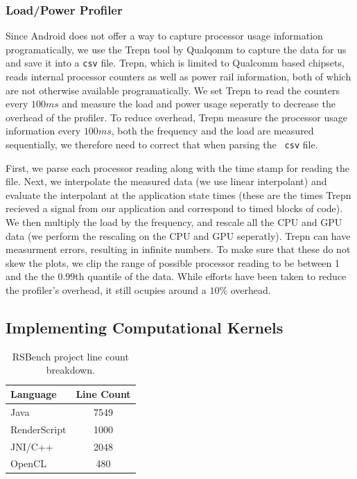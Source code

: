 \subsubsection{Load/Power Profiler}

Since Android does not offer a way to capture processor usage information
programatically, we use the Trepn tool by Qualqomm to capture the data for us
and save it into a {\tt csv} file.   Trepn, which is limited to Qualcomm based
chipsets, reads internal processor counters as well as power rail information,
both of which are not otherwise available programatically.  We set Trepn to read
the counters every $100ms$ and measure the load and power usage seperatly to
decrease the overhead of the profiler.  To reduce overhead, Trepn measure the
processor usage information every $100ms$, both the frequency and the load are
measured sequentially, we therefore need to correct that when parsing the {\tt
csv} file.

First, we parse each processor reading along with the time stamp for reading the
file.  Next, we interpolate the measured data (we use linear interpolant) and
evaluate the interpolant at the application state times (these are the times
Trepn recieved a signal from our application and correspond to timed blocks of
code).  We then multiply the load by the frequency, and rescale all the CPU and
GPU data (we perform the rescaling on the CPU and GPU seperatly).  Trepn can
have measurment errors, resulting in infinite numbers.  To make sure that these
do not skew the plots, we clip the range of possible processor reading to be
between 1 and the the $0.99$th quantile of the data.  While efforts have
been taken to reduce the profiler's overhead, it still ocupies around a
$10\%$ overhead.


\subsection{Implementing Computational Kernels}

\begin{table}[tp]\small
\centering
\begin{tabular}{ | l | c |}
    \hline 
    Language      & Line Count \\ \hline
    Java          & 7549       \\ \hline
    RenderScript  & 1000       \\ \hline
    JNI/C++       & 2048       \\ \hline
    OpenCL        & 480        \\ \hline
\end{tabular}
\caption{RSBench project line count breakdown.}
\label{table:breakdown}
\end{table}

